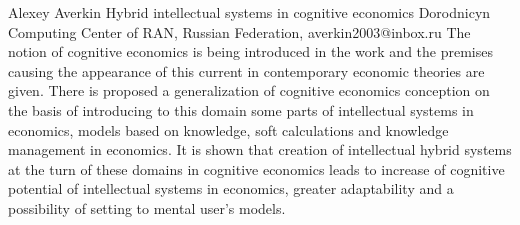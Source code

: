 \documentclass[10pt,fleqn,openany]{book} %
\begin{document}
\begin{enumerate}
	\paperabstract
		{Alexey Averkin}
		{Hybrid intellectual systems in cognitive economics}
		{Dorodnicyn Computing Center of RAN, Russian Federation, averkin2003@inbox.ru}
		{
			The notion of cognitive economics is being introduced in the work and the premises causing the appearance of this current in contemporary economic theories are given. There is proposed a generalization of cognitive economics conception on the basis of introducing to this domain some parts of intellectual systems in economics, models based on knowledge, soft calculations and knowledge management in economics. It is shown that creation of intellectual hybrid systems at the turn of these domains in cognitive economics leads to increase of cognitive potential of intellectual systems in economics, greater adaptability and a possibility of setting to mental user’s models.}
		

\end{enumerate}
\end{document}
